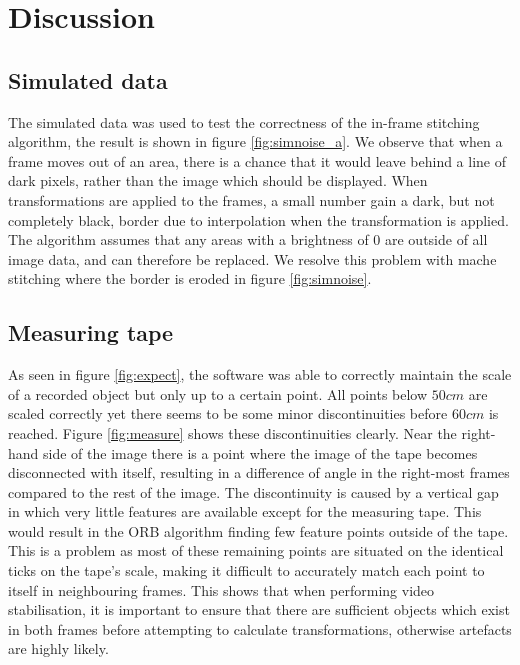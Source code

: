 \section{Discussion}
\subsection{Simulated data}
The simulated data was used to test the correctness of the in-frame stitching algorithm,
the result is shown in figure \ref{fig:simnoise_a}.
We observe that when a frame moves out of an area,
there is a chance that it would leave behind a line of dark pixels, rather than the image which should be displayed.
When transformations are applied to the frames, a small number gain a dark, but not completely black, border due to interpolation when the transformation is applied. 
The algorithm assumes that any areas with a brightness of 0 are outside of all image data, and can therefore be replaced.
We resolve this problem with mache stitching where the border is eroded in figure \ref{fig:simnoise}.


\subsection{Measuring tape}

As seen in figure \ref{fig:expect},
the software was able to correctly maintain the scale of a recorded object but only up to a certain point.
All points below $50 cm$ are scaled correctly
yet there seems to be some minor discontinuities before $60cm$ is reached.
Figure \ref{fig:measure} shows these discontinuities clearly.
Near the right-hand side of the image there is a point where the image of the tape becomes disconnected with itself,
resulting in a difference of angle in the right-most frames compared to the rest of the image.
The discontinuity is caused by a vertical gap in which very little features are available except for the measuring tape.
This would result in the ORB algorithm finding few feature points outside of the tape.
This is a problem as most of these remaining points are situated on the identical ticks on the tape's scale,
making it difficult to accurately match each point to itself in neighbouring frames.
This shows that when performing video stabilisation,
it is important to ensure that there are sufficient objects which exist in both frames before attempting to calculate transformations,  otherwise artefacts are highly likely.

